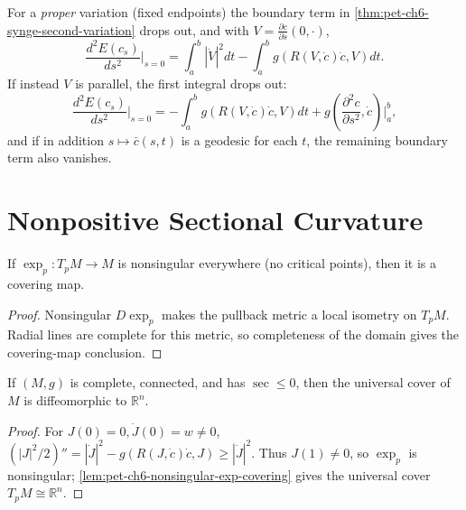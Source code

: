\begin{remark}
  \label{rem:pet-ch6-second-variation-special-cases}


  For a \emph{proper} variation (fixed endpoints) the boundary term in
  \cref{thm:pet-ch6-synge-second-variation} drops out, and with $V=\frac{\partial
  c}{\partial s}(0,\cdot)$,
  \[
    \frac{d^2E(c_s)}{ds^2}\bigg|_{s=0}=\int_a^b|\dot V|^2dt-\int_a^bg(R(V,\dot c)\dot c,V)dt.
  \]
  If instead $V$ is parallel, the first integral drops out:
  \[
    \frac{d^2E(c_s)}{ds^2}\bigg|_{s=0}=-\int_a^bg(R(V,\dot c)\dot c,V)dt
    +g\!\left(\frac{\partial^2c}{\partial s^2},\dot c\right)\bigg|_a^b,
  \]
  and if in addition $s\mapsto\bar c(s,t)$ is a geodesic for each $t$, the
  remaining boundary term also vanishes.
\end{remark}

\section{Nonpositive Sectional Curvature}

\begin{lemma}
  \label{lem:pet-ch6-nonsingular-exp-covering}

  If $\exp_p:T_pM\to M$ is nonsingular everywhere (no critical points), then it
  is a covering map.
\end{lemma}
\begin{proof}
  \sketch
  Nonsingular \(D\exp_p\) makes the pullback metric a local isometry on \(T_pM\). Radial lines are complete for this metric, so completeness of the domain gives the covering-map conclusion.
\end{proof}

\begin{theorem}
  \label{thm:pet-ch6-cartan-hadamard}


  If $(M,g)$ is complete, connected, and has $\sec\le0$, then the universal
  cover of $M$ is diffeomorphic to $\mathbb{R}^n$.
\end{theorem}
\begin{proof}
  \sketch
  For \(J(0)=0,\dot J(0)=w\ne0\), \((|J|^2/2)''=|\dot J|^2-g(R(J,\dot c)\dot c,J)\ge|\dot J|^2\). Thus \(J(1)\ne0\), so \(\exp_p\) is nonsingular; \cref{lem:pet-ch6-nonsingular-exp-covering} gives the universal cover \(T_pM\cong\mathbb R^n\).
\end{proof}

